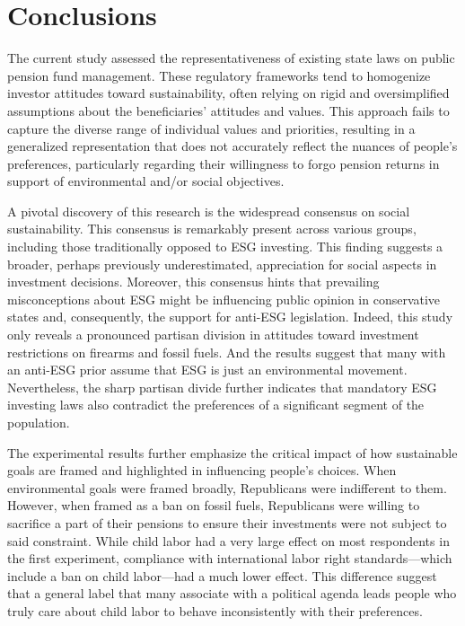 \documentclass[
  12pt,
]{article}
\begin{document}
\hypertarget{conclusions}{%
\section{Conclusions}\label{conclusions}}

The current study assessed the representativeness of existing state laws on public pension fund management. These regulatory frameworks tend to homogenize investor attitudes toward sustainability, often relying on rigid and oversimplified assumptions about the beneficiaries' attitudes and values. This approach fails to capture the diverse range of individual values and priorities, resulting in a generalized representation that does not accurately reflect the nuances of people's preferences, particularly regarding their willingness to forgo pension returns in support of environmental and/or social objectives.

A pivotal discovery of this research is the widespread consensus on social sustainability. This consensus is remarkably present across various groups, including those traditionally opposed to ESG investing. This finding suggests a broader, perhaps previously underestimated, appreciation for social aspects in investment decisions. Moreover, this consensus hints that prevailing misconceptions about ESG might be influencing public opinion in conservative states and, consequently, the support for anti-ESG legislation. Indeed, this study only reveals a pronounced partisan division in attitudes toward investment restrictions on firearms and fossil fuels. And the results suggest that many with an anti-ESG prior assume that ESG is just an environmental movement. Nevertheless, the sharp partisan divide further indicates that mandatory ESG investing laws also contradict the preferences of a significant segment of the population.

The experimental results further emphasize the critical impact of how sustainable goals are framed and highlighted in influencing people's choices. When environmental goals were framed broadly, Republicans were indifferent to them. However, when framed as a ban on fossil fuels, Republicans were willing to sacrifice a part of their pensions to ensure their investments were not subject to said constraint. While child labor had a very large effect on most respondents in the first experiment, compliance with international labor right standards---which include a ban on child labor---had a much lower effect. This difference suggest that a general label that many associate with a political agenda leads people who truly care about child labor to behave inconsistently with their preferences.
\end{document}
